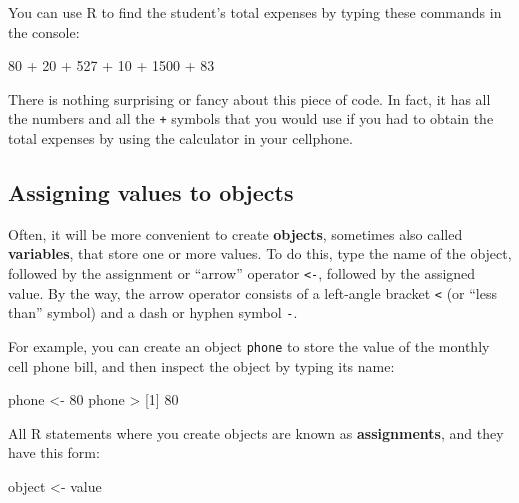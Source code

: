 \documentclass[
]{book}
\newenvironment{Shaded}{\begin{snugshade}}{\end{snugshade}}
\newcommand{\DecValTok}[1]{\textcolor[rgb]{0.00,0.00,0.81}{#1}}
\newcommand{\NormalTok}[1]{#1}
\newcommand{\OtherTok}[1]{\textcolor[rgb]{0.56,0.35,0.01}{#1}}
\newcommand{\SpecialCharTok}[1]{\textcolor[rgb]{0.00,0.00,0.00}{#1}}
\begin{document}
You can use R to find the student's total expenses by typing these commands in
the console:

\begin{Shaded}
\begin{Highlighting}[]
\DecValTok{80} \SpecialCharTok{+} \DecValTok{20} \SpecialCharTok{+} \DecValTok{527} \SpecialCharTok{+} \DecValTok{10} \SpecialCharTok{+} \DecValTok{1500} \SpecialCharTok{+} \DecValTok{83}
\end{Highlighting}
\end{Shaded}

There is nothing surprising or fancy about this piece of code. In fact, it has
all the numbers and all the \texttt{+} symbols that you would use if you had to obtain
the total expenses by using the calculator in your cellphone.

\hypertarget{assigning-values-to-objects}{%
\subsection{Assigning values to objects}\label{assigning-values-to-objects}}

Often, it will be more convenient to create \textbf{objects}, sometimes also called
\textbf{variables}, that store one or more values. To do this, type the name of the
object, followed by the assignment or ``arrow'' operator \texttt{\textless{}-}, followed by the
assigned value. By the way, the arrow operator consists of a left-angle bracket
\texttt{\textless{}} (or ``less than'' symbol) and a dash or hyphen symbol \texttt{-}.

For example, you can create an object \texttt{phone} to store the value of the monthly
cell phone bill, and then inspect the object by typing its name:

\begin{Shaded}
\begin{Highlighting}[]
\NormalTok{phone }\OtherTok{\textless{}{-}} \DecValTok{80}
\NormalTok{phone}
\SpecialCharTok{\textgreater{}}\NormalTok{ [}\DecValTok{1}\NormalTok{] }\DecValTok{80}
\end{Highlighting}
\end{Shaded}

All R statements where you create objects are known as \textbf{assignments}, and
they have this form:

\begin{Shaded}
\begin{Highlighting}[]
\NormalTok{object }\OtherTok{\textless{}{-}}\NormalTok{ value}
\end{Highlighting}
\end{Shaded}
\end{document}
